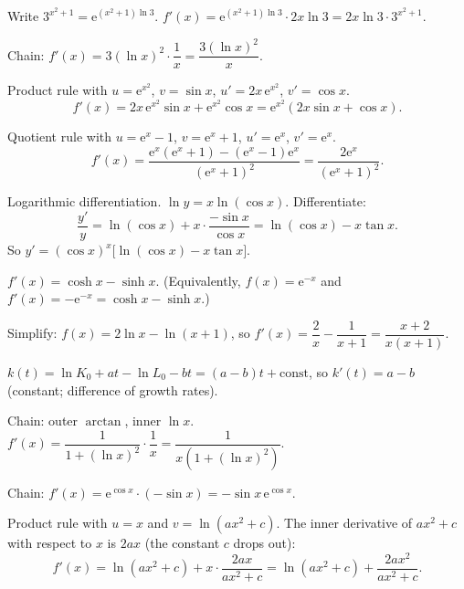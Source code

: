 \begin{solutions}
  \item Write $3^{x^{2}+1}=\mathrm{e}^{(x^{2}+1)\ln 3}$.
        $f'(x)=\mathrm{e}^{(x^{2}+1)\ln 3}\cdot 2x\ln 3
        =2x\ln 3\cdot 3^{x^{2}+1}$.

  \item Chain: $f'(x)=3(\ln x)^{2}\cdot\dfrac{1}{x}=\dfrac{3(\ln x)^{2}}{x}$.

  \item Product rule with $u=\mathrm{e}^{x^{2}}$, $v=\sin x$,
        $u'=2x\,\mathrm{e}^{x^{2}}$, $v'=\cos x$.
        \[
          f'(x)=2x\,\mathrm{e}^{x^{2}}\sin x+\mathrm{e}^{x^{2}}\cos x
               =\mathrm{e}^{x^{2}}(2x\sin x+\cos x) .
        \]

  \item Quotient rule with $u=\mathrm{e}^{x}-1$, $v=\mathrm{e}^{x}+1$,
        $u'=\mathrm{e}^{x}$, $v'=\mathrm{e}^{x}$.
        \[
          f'(x)=\frac{\mathrm{e}^{x}(\mathrm{e}^{x}+1)
                -(\mathrm{e}^{x}-1)\mathrm{e}^{x}}{(\mathrm{e}^{x}+1)^{2}}
               =\frac{2\mathrm{e}^{x}}{(\mathrm{e}^{x}+1)^{2}} .
        \]

  \item Logarithmic differentiation. $\ln y=x\ln(\cos x)$. Differentiate:
        \[
          \frac{y'}{y}=\ln(\cos x)+x\cdot\frac{-\sin x}{\cos x}
                      =\ln(\cos x)-x\tan x .
        \]
        So $y'=(\cos x)^{x}\bigl[\ln(\cos x)-x\tan x\bigr]$.

  \item $f'(x)=\cosh x-\sinh x$. (Equivalently, $f(x)=\mathrm{e}^{-x}$ and
        $f'(x)=-\mathrm{e}^{-x}=\cosh x-\sinh x$.)

  \item Simplify: $f(x)=2\ln x-\ln(x+1)$, so
        $f'(x)=\dfrac{2}{x}-\dfrac{1}{x+1}=\dfrac{x+2}{x(x+1)}$.

  \item $k(t)=\ln K_{0}+at-\ln L_{0}-bt=(a-b)t+\text{const}$, so
        $k'(t)=a-b$ (constant; difference of growth rates).

  \item Chain: outer $\arctan$, inner $\ln x$.
        $f'(x)=\dfrac{1}{1+(\ln x)^{2}}\cdot\dfrac{1}{x}
        =\dfrac{1}{x(1+(\ln x)^{2})}$.

  \item Chain: $f'(x)=\mathrm{e}^{\cos x}\cdot(-\sin x)
        =-\sin x\,\mathrm{e}^{\cos x}$.

  \item Product rule with $u=x$ and $v=\ln(ax^{2}+c)$. The inner
        derivative of $ax^{2}+c$ with respect to $x$ is $2ax$ (the constant
        $c$ drops out):
        \[
          f'(x)=\ln(ax^{2}+c)+x\cdot\frac{2ax}{ax^{2}+c}
               =\ln(ax^{2}+c)+\frac{2ax^{2}}{ax^{2}+c} .
        \]


\end{solutions}
